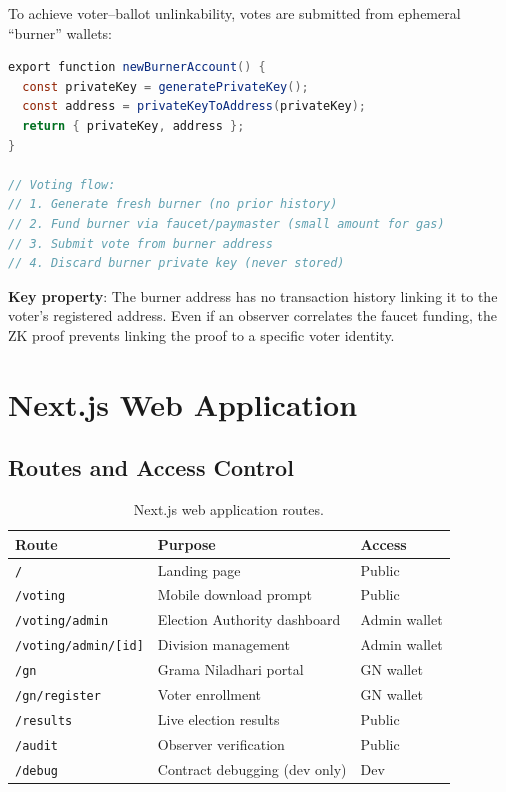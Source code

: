 To achieve voter--ballot unlinkability, votes are submitted from ephemeral ``burner'' wallets:

\begin{lstlisting}[language=Java, caption={Burner wallet creation and usage.}]
export function newBurnerAccount() {
  const privateKey = generatePrivateKey();
  const address = privateKeyToAddress(privateKey);
  return { privateKey, address };
}

// Voting flow:
// 1. Generate fresh burner (no prior history)
// 2. Fund burner via faucet/paymaster (small amount for gas)
// 3. Submit vote from burner address
// 4. Discard burner private key (never stored)
\end{lstlisting}

\textbf{Key property}: The burner address has no transaction history linking it to the voter's registered address. Even if an observer correlates the faucet funding, the ZK proof prevents linking the proof to a specific voter identity.

\section{Next.js Web Application}

\subsection{Routes and Access Control}

\begin{table}[H]
\centering
\caption{Next.js web application routes.}
\label{tab:web-routes}
\begin{tabular}{|l|l|l|}
\hline
\textbf{Route} & \textbf{Purpose} & \textbf{Access} \\
\hline
\texttt{/} & Landing page & Public \\
\hline
\texttt{/voting} & Mobile download prompt & Public \\
\hline
\texttt{/voting/admin} & Election Authority dashboard & Admin wallet \\
\hline
\texttt{/voting/admin/[id]} & Division management & Admin wallet \\
\hline
\texttt{/gn} & Grama Niladhari portal & GN wallet \\
\hline
\texttt{/gn/register} & Voter enrollment & GN wallet \\
\hline
\texttt{/results} & Live election results & Public \\
\hline
\texttt{/audit} & Observer verification & Public \\
\hline
\texttt{/debug} & Contract debugging (dev only) & Dev \\
\hline
\end{tabular}
\end{table}

